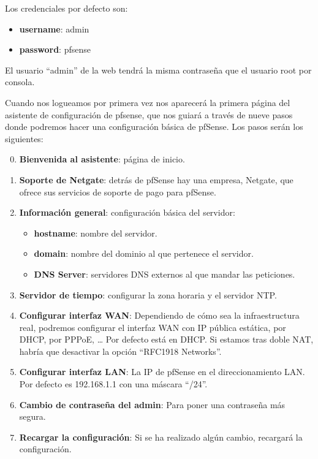 Los credenciales por defecto son:
\begin{itemize}
    \item \textbf{username}: admin
    \item \textbf{password}: pfsense
\end{itemize}

El usuario “admin” de la web tendrá la misma contraseña que el usuario root por consola.


Cuando nos logueamos por primera vez nos aparecerá la primera página del asistente de configuración de pfsense, que nos guiará a través de nueve pasos donde podremos hacer una configuración básica de pfSense. Los pasos serán los siguientes:

\begin{enumerate}
    \setcounter{enumi}{-1}
    \item \textbf{Bienvenida al asistente}: página de inicio.
    \item \textbf{Soporte de Netgate}: detrás de pfSense hay una empresa, Netgate, que ofrece sus servicios de soporte de pago para pfSense.
    \item \textbf{Información general}: configuración básica del servidor:
    \begin{itemize}
        \item \textbf{hostname}: nombre del servidor.
        \item \textbf{domain}: nombre del dominio al que pertenece el servidor.
        \item \textbf{DNS Server}: servidores DNS externos al que mandar las peticiones.
    \end{itemize}
    \item \textbf{Servidor de tiempo}: configurar la zona horaria y el servidor NTP.
    \item \textbf{Configurar interfaz WAN}: Dependiendo de cómo sea la infraestructura real, podremos configurar el interfaz WAN con IP pública estática, por DHCP, por PPPoE, … Por defecto está en DHCP. Si estamos tras doble NAT, habría que desactivar la opción “RFC1918 Networks”.
    \item \textbf{Configurar interfaz LAN}: La IP de pfSense en el direccionamiento LAN. Por defecto es 192.168.1.1 con una máscara “/24”.
    \item \textbf{Cambio de contraseña del admin}: Para poner una contraseña más segura.
    \item \textbf{Recargar la configuración}: Si se ha realizado algún cambio, recargará la configuración.
\end{enumerate}

